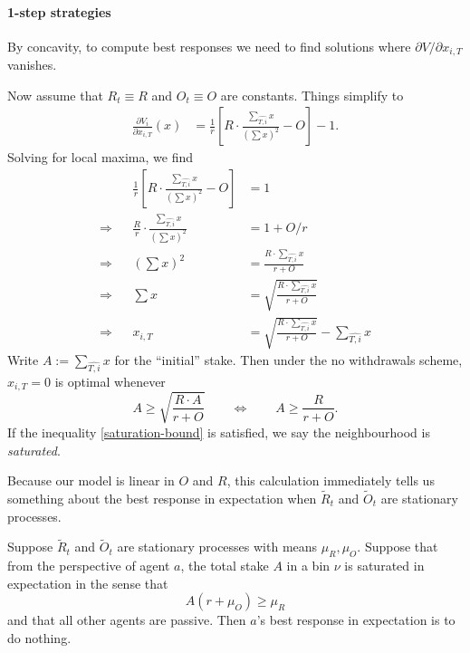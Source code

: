 \paragraph{1-step strategies} By concavity, to compute best responses we need to find solutions where $\partial V/\partial x_{i,T}$ vanishes.

Now assume that $R_t\equiv R$ and $O_t\equiv O$ are constants.
%
Things simplify to 
\begin{align*}
  \frac{\partial V_i}{\partial x_{i,T}}(x) &= \frac{1}{r}\left[R \cdot\frac{\sum_{\widehat{T,i}} x}{(\sum x)^2}  - O \right] - 1.
\end{align*}
Solving for local maxima, we find
\begin{align*}
  &&\frac{1}{r}\left[R \cdot\frac{\sum_{\widehat{T,i}} x}{(\sum x)^2}  - O \right] &= 1 \\
  \Rightarrow&& \frac{R}{r} \cdot\frac{\sum_{\widehat{T,i}} x}{(\sum x)^2} &= 1 + O/r \\
  \Rightarrow&& (\sum x)^2 &= \frac{R\cdot \sum_{\widehat{T,i}} x}{r + O} \\
  \Rightarrow&& \sum x &= \sqrt{ \frac{R\cdot \sum_{\widehat{T,i}} x}{r + O} } \\
  \Rightarrow&& x_{i,T} &= \sqrt{ \frac{R\cdot \sum_{\widehat{T,i}} x}{r + O} } - \sum_{\widehat{T,i}} x
\end{align*}
Write $A:=\sum_{\widehat{T,i}} x$ for the ``initial'' stake.
%
Then under the no withdrawals scheme, $x_{i,T}=0$ is optimal whenever
\begin{equation} \label{saturation-bound}
  A \geq \sqrt{ \frac{R\cdot A}{r + O} } \qquad  \Leftrightarrow \qquad A \geq \frac{R}{r + O}.
\end{equation}
If the inequality \eqref{saturation-bound} is satisfied, we say the neighbourhood is \emph{saturated}.

Because our model is linear in $O$ and $R$, this calculation immediately tells us something about the best response in expectation when $\tilde{R}_t$ and $\tilde{O}_t$ are stationary processes.
%
\begin{proposition}

  Suppose $\tilde{R}_t$ and $\tilde{O}_t$ are stationary processes with means $\mu_R,\mu_O$.
  Suppose that from the perspective of agent $a$, the total stake $A$ in a bin $\nu$ is saturated in expectation in the sense that
  \[
    A(r+\mu_O) \geq \mu_R
  \]
  and that all other agents are passive.
  Then $a$'s best response in expectation is to do nothing.

\end{proposition}

